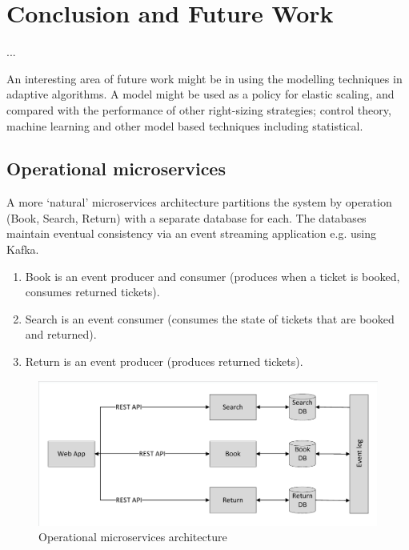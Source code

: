%
%

\section{Conclusion and Future Work}

...

An interesting area of future work might be in using the modelling techniques in adaptive algorithms.  A model might be used as a policy for elastic scaling, and compared with the performance of other right-sizing strategies; control theory, machine learning and other model based techniques including statistical.

%
%
\subsection{Operational microservices}

A more `natural' microservices architecture partitions the system by operation (Book, Search, Return) with a separate database for each.  The databases maintain eventual consistency via an event streaming application e.g. using Kafka.
\begin{enumerate}
\item Book is an event producer and consumer (produces when a ticket is booked, consumes returned tickets).
\item Search is an event consumer (consumes the state of tickets that are booked and returned).
\item Return is an event producer (produces returned tickets).
\end{enumerate}

\begin{figure}
	\caption{Operational microservices architecture}
	\centering
	\includegraphics[trim = 5 5 5 5, clip, width=\textwidth]{img/operationmicro}
\end{figure}